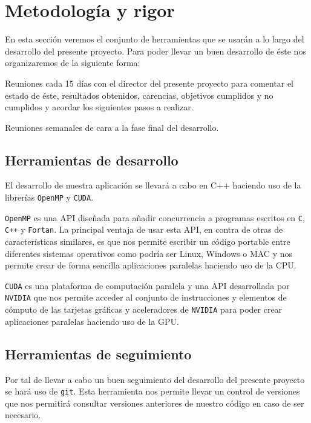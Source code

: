 \documentclass[titlepage,12pt]{report}
\begin{document}
\section{Metodología y rigor}

En esta sección veremos el conjunto de herramientas que se usarán a lo largo del desarrollo del presente proyecto. Para poder llevar un buen desarrollo de éste nos organizaremos de la siguiente forma: \begin{enumerate*}[label=\roman*)] \item Reuniones cada 15 días con el director del presente proyecto para comentar el estado de éste, resultados obtenidos, carencias, objetivos cumplidos y no cumplidos y acordar los siguientes pasos a realizar. \item Reuniones semanales de cara a la fase final del desarrollo. \end{enumerate*}

\subsection{Herramientas de desarrollo}

El desarrollo de nuestra aplicación se llevará a cabo en C++ haciendo uso de la librerías \texttt{OpenMP} y \texttt{CUDA}. 

\texttt{OpenMP} es una API diseñada para añadir concurrencia a programas escritos en \texttt{C}, \texttt{C++} y \texttt{Fortan}. La principal ventaja de usar esta API, en contra de otras de características similares, es que nos permite escribir un código portable entre diferentes sistemas operativos como podría ser Linux, Windows o MAC y nos permite crear de forma sencilla aplicaciones paralelas haciendo uso de la CPU.

\texttt{CUDA} es una plataforma de computación paralela y una API desarrollada por \texttt{NVIDIA} que nos permite acceder al conjunto de instrucciones y elementos de cómputo de las tarjetas gráficas y aceleradores de \texttt{NVIDIA} para poder crear aplicaciones paralelas haciendo uso de la GPU.

\subsection{Herramientas de seguimiento}

Por tal de llevar a cabo un buen seguimiento del desarrollo del presente proyecto se hará uso de \texttt{git}. Esta herramienta nos permite llevar un control de versiones que nos permitirá consultar versiones anteriores de nuestro código en caso de ser necesario.


\newpage
\nocite{*}


\end{document}

